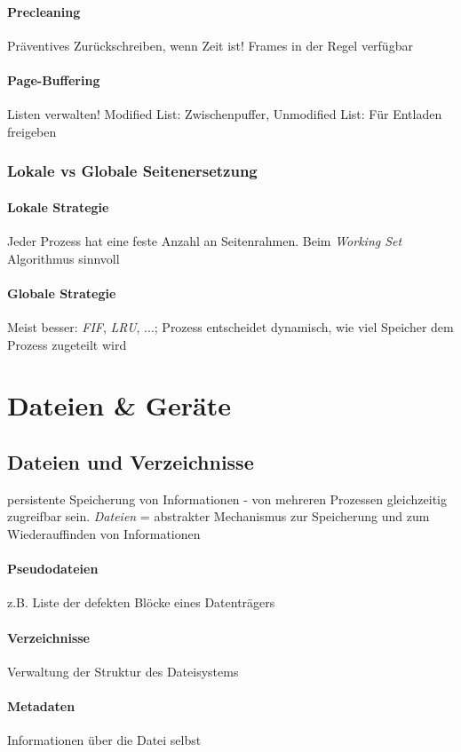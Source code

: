 \documentclass[10pt,a4paper,landscape]{article}
\begin{document}
\begin{multicols*}{3}
	\paragraph{Precleaning} Präventives Zurückschreiben, wenn Zeit ist! Frames in der Regel verfügbar
	\paragraph{Page-Buffering} Listen verwalten! Modified List: Zwischenpuffer, Unmodified List: Für Entladen freigeben
	\subsubsection{Lokale vs Globale Seitenersetzung}
	\paragraph{Lokale Strategie} Jeder Prozess hat eine feste Anzahl an Seitenrahmen. Beim \textit{Working Set} Algorithmus sinnvoll
	\paragraph{Globale Strategie} Meist besser: \textit{FIF}, \textit{LRU}, ...; Prozess entscheidet dynamisch, wie viel Speicher dem Prozess zugeteilt wird
	\section{Dateien \& Geräte}
	\subsection{Dateien und Verzeichnisse}
	persistente Speicherung von Informationen - von mehreren Prozessen gleichzeitig zugreifbar sein. \textit{Dateien} = abstrakter Mechanismus zur Speicherung und zum Wiederauffinden von Informationen
	\paragraph{Pseudodateien} z.B. Liste der defekten Blöcke eines Datenträgers
	\paragraph{Verzeichnisse} Verwaltung der Struktur des Dateisystems
	\paragraph{Metadaten} Informationen über die Datei selbst

\end{multicols*}
\end{document}
